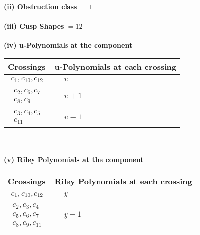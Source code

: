 \documentclass[1p]{elsarticle_modified}
\theoremstyle{definition}
\begin{document}
\flushleft \textbf{(ii) Obstruction class $= 1$}\\~\\
\flushleft \textbf{(iii) Cusp Shapes $= 12$}\\~\\
\newpage\renewcommand{\arraystretch}{1}
\flushleft \textbf{(iv) u-Polynomials at the component}\newline \\
\begin{tabular}{m{50pt}|m{274pt}}
Crossings & \hspace{64pt}u-Polynomials at each crossing \\
\hline $$\begin{aligned}c_{1},c_{10},c_{12}\end{aligned}$$&$\begin{aligned}
&u
\end{aligned}$\\
\hline $$\begin{aligned}c_{2},c_{6},c_{7}\\c_{8},c_{9}\end{aligned}$$&$\begin{aligned}
&u+1
\end{aligned}$\\
\hline $$\begin{aligned}c_{3},c_{4},c_{5}\\c_{11}\end{aligned}$$&$\begin{aligned}
&u-1
\end{aligned}$\\
\hline
\end{tabular}\\~\\
\newpage\renewcommand{\arraystretch}{1}
\flushleft \textbf{(v) Riley Polynomials at the component}\newline \\
\begin{tabular}{m{50pt}|m{274pt}}
Crossings & \hspace{64pt}Riley Polynomials at each crossing \\
\hline $$\begin{aligned}c_{1},c_{10},c_{12}\end{aligned}$$&$\begin{aligned}
&y
\end{aligned}$\\
\hline $$\begin{aligned}c_{2},c_{3},c_{4}\\c_{5},c_{6},c_{7}\\c_{8},c_{9},c_{11}\end{aligned}$$&$\begin{aligned}
&y-1
\end{aligned}$\\
\hline
\end{tabular}\\~\\
\end{document}
